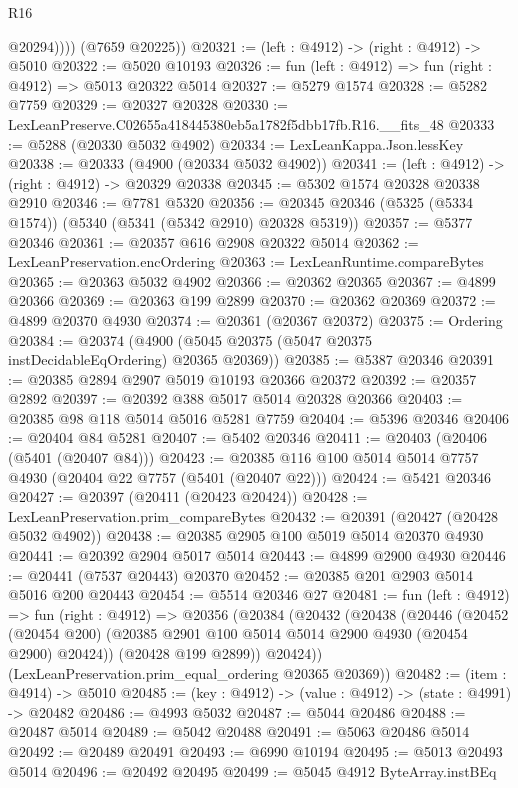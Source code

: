 \begin{lexlean}{R16}
\begin{coremodule}
              @20294))))
      (@7659 @20225))
@20321 := (left : @4912) -> (right : @4912) -> @5010
@20322 := @5020 @10193
@20326 := fun (left : @4912) => fun (right : @4912) => @5013 @20322 @5014
@20327 := @5279 @1574
@20328 := @5282 @7759
@20329 := @20327 @20328
@20330 := LexLeanPreserve.C02655a418445380eb5a1782f5dbb17fb.R16.__fits_48
@20333 := @5288 (@20330 @5032 @4902)
@20334 := LexLeanKappa.Json.lessKey
@20338 := @20333 (@4900 (@20334 @5032 @4902))
@20341 := (left : @4912) -> (right : @4912) -> @20329 @20338
@20345 := @5302 @1574 @20328 @20338 @2910
@20346 := @7781 @5320
@20356 := @20345 @20346 (@5325 (@5334 @1574)) (@5340 (@5341 (@5342 @2910) @20328 @5319))
@20357 := @5377 @20346
@20361 := @20357 @616 @2908 @20322 @5014
@20362 := LexLeanPreservation.encOrdering
@20363 := LexLeanRuntime.compareBytes
@20365 := @20363 @5032 @4902
@20366 := @20362 @20365
@20367 := @4899 @20366
@20369 := @20363 @199 @2899
@20370 := @20362 @20369
@20372 := @4899 @20370 @4930
@20374 := @20361 (@20367 @20372)
@20375 := Ordering
@20384 := @20374 (@4900 (@5045 @20375 (@5047 @20375 instDecidableEqOrdering) @20365 @20369))
@20385 := @5387 @20346
@20391 := @20385 @2894 @2907 @5019 @10193 @20366 @20372
@20392 := @20357 @2892
@20397 := @20392 @388 @5017 @5014 @20328 @20366
@20403 := @20385 @98 @118 @5014 @5016 @5281 @7759
@20404 := @5396 @20346
@20406 := @20404 @84 @5281
@20407 := @5402 @20346
@20411 := @20403 (@20406 (@5401 (@20407 @84)))
@20423 := @20385 @116 @100 @5014 @5014 @7757 @4930 (@20404 @22 @7757 (@5401 (@20407 @22)))
@20424 := @5421 @20346
@20427 := @20397 (@20411 (@20423 @20424))
@20428 := LexLeanPreservation.prim_compareBytes
@20432 := @20391 (@20427 (@20428 @5032 @4902))
@20438 := @20385 @2905 @100 @5019 @5014 @20370 @4930
@20441 := @20392 @2904 @5017 @5014
@20443 := @4899 @2900 @4930
@20446 := @20441 (@7537 @20443) @20370
@20452 := @20385 @201 @2903 @5014 @5016 @200 @20443
@20454 := @5514 @20346 @27
@20481 := fun (left : @4912) =>
  fun (right : @4912) =>
  @20356
    (@20384
      (@20432
        (@20438
          (@20446
            (@20452 (@20454 @200) (@20385 @2901 @100 @5014 @5014 @2900 @4930 (@20454 @2900) @20424))
            (@20428 @199 @2899))
          @20424))
      (LexLeanPreservation.prim_equal_ordering @20365 @20369))
@20482 := (item : @4914) -> @5010
@20485 := (key : @4912) -> (value : @4912) -> (state : @4991) -> @20482
@20486 := @4993 @5032
@20487 := @5044 @20486
@20488 := @20487 @5014
@20489 := @5042 @20488
@20491 := @5063 @20486 @5014
@20492 := @20489 @20491
@20493 := @6990 @10194
@20495 := @5013 @20493 @5014
@20496 := @20492 @20495
@20499 := @5045 @4912 ByteArray.instBEq

\end{coremodule}
\end{lexlean}
